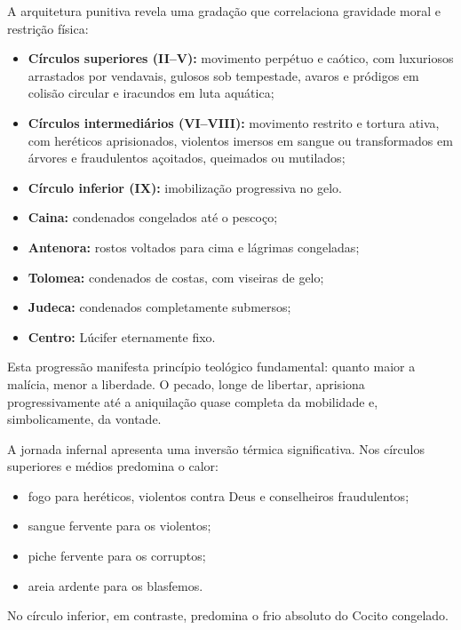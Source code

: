 A arquitetura punitiva revela uma gradação que correlaciona gravidade moral e
restrição física:

\begin{itemize}
  \item \textbf{Círculos superiores (II--V):} movimento perpétuo e caótico,
  com luxuriosos arrastados por vendavais, gulosos sob tempestade, avaros e
  pródigos em colisão circular e iracundos em luta aquática;
  \item \textbf{Círculos intermediários (VI--VIII):} movimento restrito e
  tortura ativa, com heréticos aprisionados, violentos imersos em sangue ou
  transformados em árvores e fraudulentos açoitados, queimados ou mutilados;
  \item \textbf{Círculo inferior (IX):} imobilização progressiva no gelo.
\end{itemize}


\begin{itemize}
  \item \textbf{Caina:} condenados congelados até o pescoço;
  \item \textbf{Antenora:} rostos voltados para cima e lágrimas congeladas;
  \item \textbf{Tolomea:} condenados de costas, com viseiras de gelo;
  \item \textbf{Judeca:} condenados completamente submersos;
  \item \textbf{Centro:} Lúcifer eternamente fixo.
\end{itemize}

Esta progressão manifesta princípio teológico fundamental: quanto maior a malícia, menor a liberdade. O pecado, longe de libertar, aprisiona progressivamente até a aniquilação quase completa da mobilidade e, simbolicamente, da vontade.


A jornada infernal apresenta uma inversão térmica significativa. Nos círculos
superiores e médios predomina o calor:

\begin{itemize}
  \item fogo para heréticos, violentos contra Deus e conselheiros fraudulentos;
  \item sangue fervente para os violentos;
  \item piche fervente para os corruptos;
  \item areia ardente para os blasfemos.
\end{itemize}

No círculo inferior, em contraste, predomina o frio absoluto do Cocito congelado.

